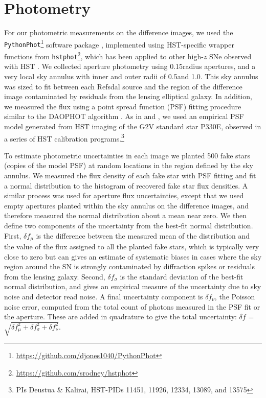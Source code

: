 \section{Photometry}\label{sec:Photometry}

For our photometric measurements on the difference images, we used the {\tt PythonPhot}\footnote{\url{https://github.com/djones1040/PythonPhot}} software package \citep{Jones:2015}, implemented using HST-specific wrapper functions from {\tt hstphot}\footnote{\url{https://github.com/srodney/hstphot}}, which has been applied to other high-$z$ SNe observed with HST \citep[e.g.][]{Rodney:2015a,Rodney:2015b}.   We collected aperture photometry using 0.15\arcsec radius apertures, and a very local sky annulus with inner and outer radii of 0.5\arcsec and 1.0\arcsec.  This sky annulus was sized to fit between each Refsdal source and the region of the difference image contaminated by residuals from the lensing elliptical galaxy.  In addition, we measured the flux using a point spread function (PSF) fitting procedure similar to the DAOPHOT algorithm \citep{Stetson:1987}.  As in \citet{Rodney:2015a} and \citet{Rodney:2015b}, we used an empirical PSF model generated from HST imaging of the G2V standard star P330E, observed in a series of HST calibration programs.\footnote{PIs Deustua \& Kalirai, HST-PIDs 11451, 11926, 12334, 13089, and 13575}

To estimate photometric uncertainties in each image we planted 500 fake stars (copies of the model PSF) at random locations in the region defined by the sky annulus.  We measured the flux density of each fake star with PSF fitting and fit a normal distribution to the histogram of recovered fake star flux densities. A similar process was used for aperture flux uncertainties, except that we used empty apertures planted within the sky annulus on the difference images, and therefore measured the normal distribution about a mean near zero.   We then define two components of the uncertainty from the best-fit normal distribution. First, $\delta f_{\mu}$ is the difference between the measured mean of the distribution and the value of the flux assigned to all the planted fake stars, which is typically very close to zero but can gives an estimate of systematic biases in cases where the sky region around the SN is strongly contaminated by diffraction spikes or residuals from the lensing galaxy.  Second,  $\delta f_{\sigma}$ is the standard deviation of the best-fit normal distribution, and gives an empirical measure of the uncertainty due to sky noise and detector read noise. A final uncertainty component is $\delta f_{\nu}$, the Poisson noise error, computed from the total count of photons measured in the PSF fit or the aperture.  These are added in quadrature to give the total uncertainty: $\delta f$ = $\sqrt{ \delta f_{\mu}^2 + \delta f_{\sigma}^2 + \delta f_{\nu}^2}$.

